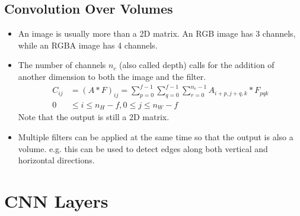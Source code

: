 \subsection{Convolution Over Volumes}
\begin{itemize}
  \item An image is usually more than a 2D matrix. An RGB image has 3 channels, while an RGBA image has 4 channels. 
  \item The number of channels $n_c$ (also called depth) calls for the addition of another dimension to both the image and the filter.
  \begin{align*}
    C_{ij}&=\left(A*F\right)_{ij}=\displaystyle\sum_{p=0}^{f-1}\displaystyle\sum_{q=0}^{f-1}\displaystyle\sum_{r=0}^{n_c-1}A_{i+p,j+q,k}*F_{pqk}\\
    0&\le i\le n_H-f, 0\le j\le n_W-f
  \end{align*}
  Note that the output is still a 2D matrix.
  \item Multiple filters can be applied at the same time so that the output is also a volume. e.g. this can be used to detect edges along both vertical and horizontal directions.
\end{itemize}
\section{CNN Layers}
